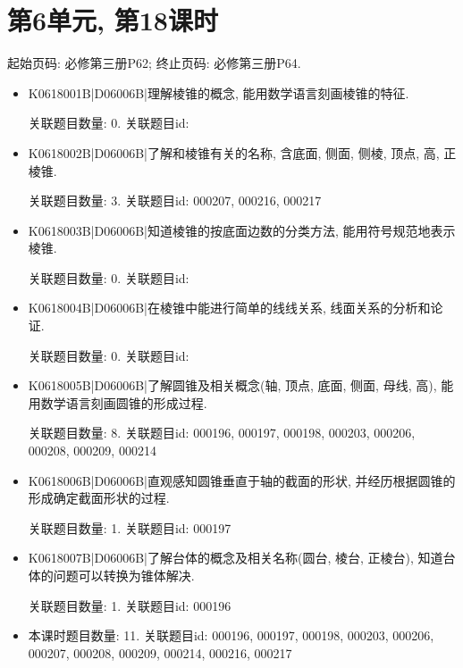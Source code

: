 \section*{第6单元, 第18课时}
起始页码: 必修第三册P62; 终止页码: 必修第三册P64.
\begin{itemize}
\item K0618001B|D06006B|理解棱锥的概念, 能用数学语言刻画棱锥的特征.

关联题目数量: 0. 关联题目id: 

\item K0618002B|D06006B|了解和棱锥有关的名称, 含底面, 侧面, 侧棱, 顶点, 高, 正棱锥.

关联题目数量: 3. 关联题目id: 000207, 000216, 000217

\item K0618003B|D06006B|知道棱锥的按底面边数的分类方法, 能用符号规范地表示棱锥.

关联题目数量: 0. 关联题目id: 

\item K0618004B|D06006B|在棱锥中能进行简单的线线关系, 线面关系的分析和论证.

关联题目数量: 0. 关联题目id: 

\item K0618005B|D06006B|了解圆锥及相关概念(轴, 顶点, 底面, 侧面, 母线, 高), 能用数学语言刻画圆锥的形成过程.

关联题目数量: 8. 关联题目id: 000196, 000197, 000198, 000203, 000206, 000208, 000209, 000214

\item K0618006B|D06006B|直观感知圆锥垂直于轴的截面的形状, 并经历根据圆锥的形成确定截面形状的过程.

关联题目数量: 1. 关联题目id: 000197

\item K0618007B|D06006B|了解台体的概念及相关名称(圆台, 棱台, 正棱台), 知道台体的问题可以转换为锥体解决.

关联题目数量: 1. 关联题目id: 000196

\item 本课时题目数量: 11. 关联题目id: 000196, 000197, 000198, 000203, 000206, 000207, 000208, 000209, 000214, 000216, 000217

\end{itemize}


